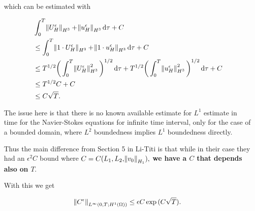 \documentclass[11pt]{article}
\newcommand*\diff{\mathop{}\!\mathrm{d}}
\begin{document}
which can be estimated with

\begin{equation}
  \begin{split}
    & \int_0^T \norm{U_H^\epsilon}_{H^3} + \norm{u_H^\epsilon}_{H^3} \diff \tau + C \\
    & \leq \int_0^T \norm{1 \cdot U_H^\epsilon}_{H^3} + \norm{1 \cdot u_H^\epsilon}_{H^3} \diff \tau + C \\
    & \leq T^{1/2} \bigg (\int_0^T \norm{U_H^\epsilon}_{H^3}^2 \bigg )^{1/2} \diff \tau + T^{1/2} \bigg (\int_0^T \norm{u_H^\epsilon}_{H^3}^2 \bigg )^{1/2} \diff \tau + C \\
    & \leq T^{1/2} C + C \\
    & \leq C \sqrt{T}.
  \end{split}
\end{equation}

The issue here is that there is no known available estimate for $L^1$ estimate in time for the Navier-Stokes equations for infinite time interval, only for the case of a bounded domain, where $L^2$ boundedness implies $L^1$ boundedness directly.

Thus the main difference from Section 5 in Li-Titi is that while in their case they had an $\epsilon^2 C$ bound where $C=C(L_1, L_2, \norm{v_0}_{H_1}),$ \textbf{we have a $C$ that depends also on $T.$}

With this we get

\[ \norm{C^\epsilon}_{L^\infty(0,T; H^1(\Omega))} \leq \epsilon C \exp{(C \sqrt{T})}.\]
\end{document}
